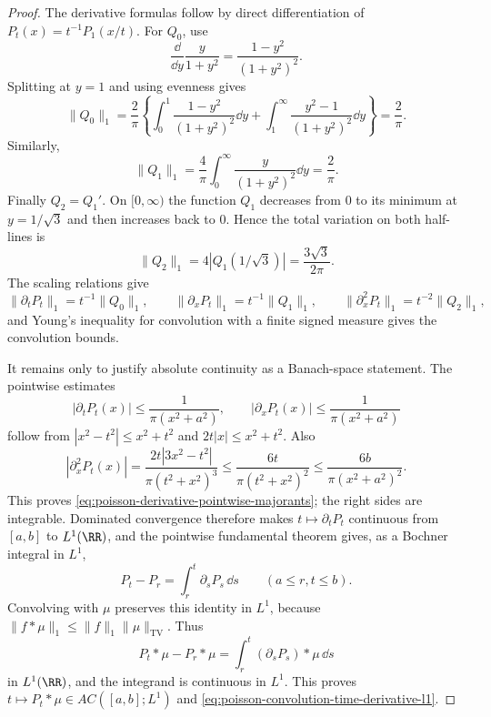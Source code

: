 \begin{proof}
The derivative formulas follow by direct differentiation of
\(P_t(x)=t^{-1}P_1(x/t)\).  For \(Q_0\), use
\[
\frac{\dd}{\dd y}\frac{y}{1+y^2}
=\frac{1-y^2}{(1+y^2)^2}.
\]
Splitting at \(y=1\) and using evenness gives
\[
\|Q_0\|_1
=\frac2\pi\left\{
\int_0^1\frac{1-y^2}{(1+y^2)^2}\dd y
+\int_1^\infty\frac{y^2-1}{(1+y^2)^2}\dd y
\right\}
=\frac2\pi.
\]
Similarly,
\[
\|Q_1\|_1
=\frac4\pi\int_0^\infty\frac{y}{(1+y^2)^2}\dd y
=\frac2\pi.
\]
Finally \(Q_2=Q_1'\).  On \([0,\infty)\) the function \(Q_1\) decreases
from \(0\) to its minimum at \(y=1/\sqrt3\) and then increases back to
\(0\).  Hence the total variation on both half-lines is
\[
\|Q_2\|_1
=4\left|Q_1(1/\sqrt3)\right|
=\frac{3\sqrt3}{2\pi}.
\]
The scaling relations give
\[
\|\partial_tP_t\|_1=t^{-1}\|Q_0\|_1,\qquad
\|\partial_xP_t\|_1=t^{-1}\|Q_1\|_1,\qquad
\|\partial_x^2P_t\|_1=t^{-2}\|Q_2\|_1,
\]
and Young's inequality for convolution with a finite signed measure gives
the convolution bounds.

It remains only to justify absolute continuity as a Banach-space statement.
The pointwise estimates
\[
|\partial_tP_t(x)|\le\frac{1}{\pi(x^2+a^2)},\qquad
|\partial_xP_t(x)|\le\frac{1}{\pi(x^2+a^2)}
\]
follow from
\(|x^2-t^2|\le x^2+t^2\) and \(2t|x|\le x^2+t^2\).  Also
\[
|\partial_x^2P_t(x)|
=\frac{2t|3x^2-t^2|}{\pi(t^2+x^2)^3}
\le \frac{6t}{\pi(t^2+x^2)^2}
\le \frac{6b}{\pi(x^2+a^2)^2}.
\]
This proves \eqref{eq:poisson-derivative-pointwise-majorants}; the right
sides are integrable.  Dominated convergence therefore makes
\(t\mapsto\partial_tP_t\) continuous from \([a,b]\) to \(L^1(\RR)\), and
the pointwise fundamental theorem gives, as a Bochner integral in \(L^1\),
\[
P_t-P_r=\int_r^t\partial_sP_s\,\dd s\qquad(a\le r,t\le b).
\]
Convolving with \(\mu\) preserves this identity in \(L^1\), because
\(\|f*\mu\|_1\le\|f\|_1\|\mu\|_{\mathrm{TV}}\).  Thus
\[
P_t*\mu-P_r*\mu
=\int_r^t(\partial_sP_s)*\mu\,\dd s
\]
in \(L^1(\RR)\), and the integrand is continuous in \(L^1\).  This proves
\(t\mapsto P_t*\mu\in AC([a,b];L^1)\) and
\eqref{eq:poisson-convolution-time-derivative-l1}.
\end{proof}

